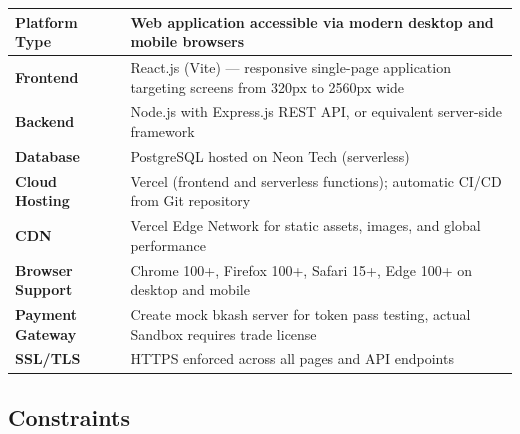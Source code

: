 \documentclass[12pt, a4paper]{article}
\begin{document}
\vspace{8pt}
\renewcommand{\arraystretch}{1.5}
\begin{tabular}{|L{3.2cm}|L{12cm}|}
  \hline
  \textbf{\small\color{darkgreen}Platform Type} & \small Web application accessible via modern desktop and mobile browsers \\
  \hline
  \textbf{\small\color{darkgreen}Frontend} & \small React.js (Vite) — responsive single-page application targeting screens from 320px to 2560px wide \\
  \hline
  \textbf{\small\color{darkgreen}Backend} & \small Node.js with Express.js REST API, or equivalent server-side framework \\
  \hline
  \textbf{\small\color{darkgreen}Database} & \small PostgreSQL hosted on Neon Tech (serverless) \\
  \hline
  \textbf{\small\color{darkgreen}Cloud Hosting} & \small Vercel (frontend and serverless functions); automatic CI/CD from Git repository \\
  \hline
  \textbf{\small\color{darkgreen}CDN} & \small Vercel Edge Network for static assets, images, and global performance \\
  \hline
  \textbf{\small\color{darkgreen}Browser Support} & \small Chrome 100+, Firefox 100+, Safari 15+, Edge 100+ on desktop and mobile \\
  \hline
  \textbf{\small\color{darkgreen}Payment Gateway} & \small Create mock bkash server for token pass testing, actual Sandbox requires trade license \\
  \hline
  \textbf{\small\color{darkgreen}SSL/TLS} & \small HTTPS enforced across all pages and API endpoints \\
  \hline
\end{tabular}

\subsection{Constraints}
\end{document}
